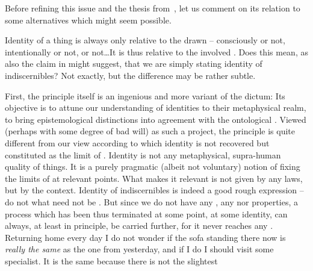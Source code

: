 Before refining this issue and the thesis from~, let us
comment on its relation to 
some alternatives which might seem possible.



\pa \label{ft:identidiscern} Identity of a thing is always only relative to the
drawn  -- consciously or not, intentionally or not,
 or not\ldots It is thus relative to the involved .
Does this mean, as also the claim in  might suggest, that we
are simply stating identity of indiscernibles? Not exactly, but the difference
may be rather subtle.

First, the principle itself is an ingenious and more  variant of the
dictum:  Its
objective is to attune our understanding of identities to their metaphysical
realm, to bring epistemological distinctions into agreement with the ontological
.  Viewed (perhaps with some degree of bad will) as such a project,
the principle is quite different from our view according to which identity is
not recovered but constituted as the limit of .  Identity is
not any metaphysical, supra-human quality of things.  It is a purely pragmatic
(albeit not voluntary) notion of fixing the limits of  at
relevant points.  What makes it relevant is not given by any laws, but by the
context.  Identity of indiscernibles is indeed a good rough expression -- do not
 what need not be .  But since we do not have
any , any  nor  properties, a
process which has been thus terminated at some point, at some identity, can
always, at least in principle, be carried further, for it never reaches any
.  Returning home every day I do not wonder if the sofa standing
there now is {\em really the same} as the one from yesterday, and if I do I
should visit some specialist. It is the same because there is not the slightest
